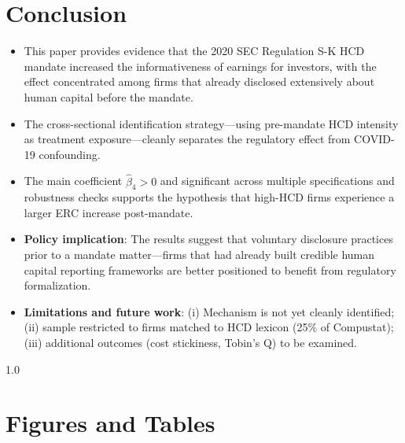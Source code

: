 \documentclass[12pt,english]{article}
\begin{document}
\section{Conclusion}\label{sec:conclusion}

\begin{itemize}
    \item This paper provides evidence that the 2020 SEC Regulation S-K HCD
          mandate increased the informativeness of earnings for investors,
          with the effect concentrated among firms that already disclosed
          extensively about human capital before the mandate.
    \item The cross-sectional identification strategy---using pre-mandate HCD
          intensity as treatment exposure---cleanly separates the regulatory
          effect from COVID-19 confounding.
    \item The main coefficient $\hat{\beta}_4 > 0$ and significant across
          multiple specifications and robustness checks supports the
          hypothesis that high-HCD firms experience a larger ERC increase
          post-mandate.
    \item \textbf{Policy implication}: The results suggest that voluntary
          disclosure practices prior to a mandate matter---firms that had
          already built credible human capital reporting frameworks are better
          positioned to benefit from regulatory formalization.
    \item \textbf{Limitations and future work}: (i) Mechanism is not yet
          cleanly identified; (ii) sample restricted to firms matched to HCD
          lexicon (25\% of Compustat); (iii) additional outcomes (cost
          stickiness, Tobin's Q) to be examined.
\end{itemize}

\vfill
\pagebreak{}
\begin{spacing}{1.0}


\end{spacing}

\vfill
\pagebreak{}
\clearpage

\section*{Figures and Tables}\label{sec:figTables}
\end{document}
